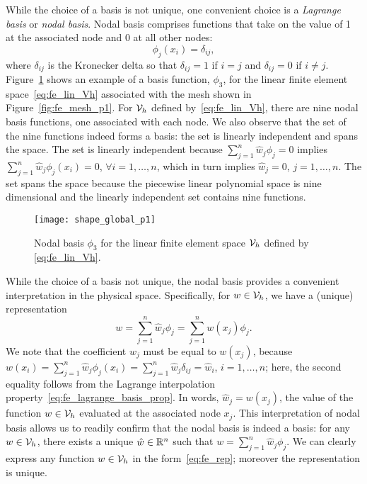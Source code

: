 While the choice of a basis is not unique, one convenient choice is a \emph{Lagrange basis} or \emph{nodal basis}.  Nodal basis comprises functions that take on the value of 1 at the associated node and 0 at all other nodes:
\begin{equation}
  \phi_j(x_i) = \delta_{ij},
  \label{eq:fe_lagrange_basis_prop}
\end{equation}
where $\delta_{ij}$ is the Kronecker delta so that $\delta_{ij} = 1$ if $i = j$ and $\delta_{ij} = 0$ if $i \neq j$. Figure~\ref{fig:fe_shape_global_p1} shows an example of a basis function, $\phi_3$, for the linear finite element space~\eqref{eq:fe_lin_Vh} associated with the mesh shown in Figure~\ref{fig:fe_mesh_p1}.  For $\mathcal{V}_h$ defined by~\eqref{eq:fe_lin_Vh}, there are nine nodal basis functions, one associated with each node.  We also observe that the set of the nine functions indeed forms a basis: the set is linearly independent and spans the space. The set is linearly independent because $\sum_{j=1}^n \hat w_j \phi_j = 0$ implies $\sum_{j=1}^n \hat w_j \phi_j(x_i) = 0$, $\forall i =1,\dots,n$, which in turn implies $\hat w_j = 0$, $j = 1,\dots,n$.  The set spans the space because the piecewise linear polynomial space is nine dimensional and the linearly independent set contains nine functions.

\begin{figure}
  \centering
  \texttt{[image: shape\_global\_p1]}
  \caption{Nodal basis $\phi_3$ for the linear finite element space $\mathcal{V}_h$ defined by \eqref{eq:fe_lin_Vh}.}
  \label{fig:fe_shape_global_p1}
\end{figure}

While the choice of a basis not unique, the nodal basis provides a convenient interpretation in the physical space.  Specifically, for $w \in \mathcal{V}_h$, we have a (unique) representation
\begin{equation}
  w = \sum_{j=1}^n \hat w_j \phi_j = \sum_{j=1}^n w(x_j) \phi_j.
  \label{eq:fe_rep}
\end{equation}
We note that the coefficient $\hat w_j$ must be equal to $w(x_j)$, because $w(x_i) = \sum_{j=1}^n \hat w_j \phi_j(x_i) = \sum_{j=1}^n \hat w_j \delta_{ij} = \hat w_i$, $i = 1,\dots,n$; here, the second equality follows from the Lagrange interpolation property~\eqref{eq:fe_lagrange_basis_prop}.  In words, $\hat w_j = w(x_j)$, the value of the function $w \in \mathcal{V}_h$ evaluated at the associated node $x_j$. This interpretation of nodal basis allows us to readily confirm that the nodal basis is indeed a basis: for any $w \in \mathcal{V}_h$, there exists a unique $\hat w \in \mathbb{R}^n$ such that $w = \sum_{j=1}^n \hat w_j \phi_j$.  We can clearly express any function $w \in \mathcal{V}_h$ in the form~\eqref{eq:fe_rep}; moreover the representation is unique. 

